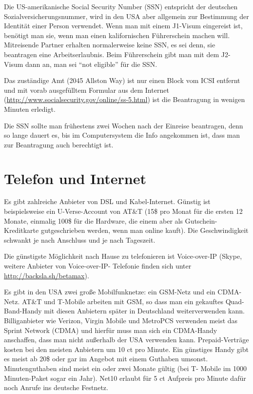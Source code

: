 \documentclass[a4paper]{scrreprt}
\begin{document}
Die US-amerikanische Social Security Number (SSN) entspricht der deutschen Sozialversicherungsnummer, wird in den USA aber allgemein zur Bestimmung der Identität einer Person verwendet. Wenn man mit einem J1-Visum eingereist ist, benötigt man sie, wenn man einen kalifornischen Führerschein machen will. Mitreisende Partner erhalten normalerweise keine SSN, es sei denn, sie beantragen eine Arbeitserlaubnis. Beim Führerschein gibt man mit dem J2- Visum dann an, man sei "`not eligible"' für die SSN.

Das zuständige Amt (2045 Allston Way) ist nur einen Block vom ICSI entfernt und mit vorab ausgefülltem Formular aus dem Internet (\url{http://www.socialsecurity.gov/online/ss-5.html}) ist die Beantragung in wenigen Minuten erledigt.

Die SSN sollte man frühestens zwei Wochen nach der Einreise beantragen, denn so lange dauert es, bis im Computersystem die Info angekommen ist, dass man zur Beantragung auch berechtigt ist.


\section{Telefon und Internet}

Es gibt zahlreiche Anbieter von DSL und Kabel-Internet. Günstig ist beispielsweise ein U-Verse-Account von AT\&T (15\$ pro Monat für die ersten 12 Monate, einmalig 100\$ für die Hardware, die einem aber als Gutschein-Kreditkarte gutgeschrieben werden, wenn man online kauft). Die Geschwindigkeit schwankt je nach Anschluss und je nach Tageszeit.

Die günstigste Möglichkeit nach Hause zu telefonieren ist Voice-over-IP (Skype, weitere Anbieter von Voice-over-IP- Telefonie finden sich unter  \url{http://backsla.sh/betamax}).

Es gibt in den USA zwei große Mobilfunknetze: ein GSM-Netz und ein CDMA-Netz. AT\&T und T-Mobile arbeiten mit GSM, so dass man ein gekauftes Quad-Band-Handy mit diesen Anbietern später in Deutschland weiterverwenden kann. Billiganbieter wie Verizon, Virgin Mobile und MetroPCS verwenden meist das Sprint Network (CDMA) und hierfür muss man sich ein CDMA-Handy anschaffen, dass man nicht außerhalb der USA verwenden kann.
Prepaid-Verträge kosten bei den meisten Anbietern um 10 ct pro Minute. Ein günstiges Handy gibt es meist ab 20\$ oder gar im Angebot mit einem Guthaben umsonst. Minutenguthaben sind meist ein oder zwei Monate gültig (bei T- Mobile im 1000 Minuten-Paket sogar ein Jahr). Net10 erlaubt für 5 ct Aufpreis pro Minute dafür noch Anrufe ins deutsche Festnetz.
\end{document}
